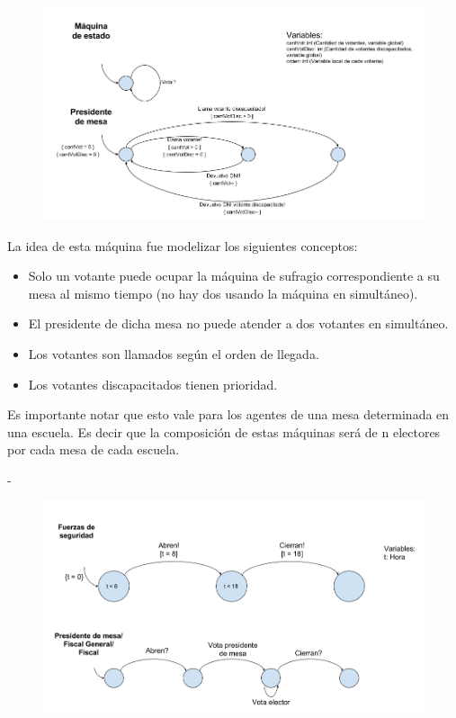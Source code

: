 \begin{figure}[h!]
\centering
\includegraphics[scale=0.45]{imagenes/FSMs/Sufragio/Unvotantealavez2}
\end{figure} 

La idea de esta máquina fue modelizar los siguientes conceptos:
\begin{itemize}
\item Solo un votante puede ocupar la máquina de sufragio correspondiente a su mesa al mismo tiempo (no hay dos usando la máquina en simultáneo).
\item El presidente de dicha mesa no puede atender a dos votantes en simultáneo.
\item Los votantes son llamados según el orden de llegada.
\item Los votantes discapacitados tienen prioridad.

\end{itemize}

Es importante notar que esto vale para los agentes de una mesa determinada en una escuela. Es decir que la composición de estas máquinas será de n electores por cada mesa de cada escuela.

-\newpage
\begin{figure}[h!]
\centering
\includegraphics[scale=0.45]{imagenes/FSMs/Sufragio/Horariodesufragio}
\end{figure}

